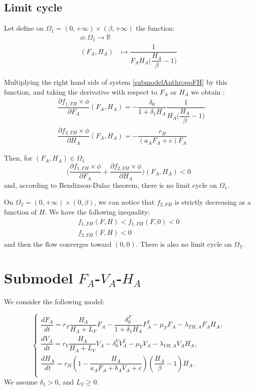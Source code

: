 \documentclass{article}
\begin{document}
\subsection{Limit cycle}

Let define on $\Omega_1 = (0, +\infty)\times (\beta, +\infty)$ the function:
\begin{align}
\phi : \Omega_1 \longrightarrow \mathbb{R} \label{limit cylce:phiFH}
\\
\nonumber
(F_A,H_A) & \mapsto \dfrac{1}{F_A H_A \Big(\dfrac{H_A}{\beta} - 1\Big)}
\end{align}

Multiplying the right hand side of system \eqref{submodelAnthropoFH} by this function, and taking the derivative with respect to $F_A$ or $H_A$ we obtain :
\begin{subequations}
\begin{align}
&\dfrac{\partial f_{1,FH} \times \phi}{\partial F_A}(F_A,H_A) = - \dfrac{\delta_0}{1 + \delta_1 H_A} \dfrac{1}{H_A \big(\dfrac{H_A}{\beta}-1 \big)} \\
&\dfrac{\partial f_{2,FH} \times \phi}{\partial H_A}(F_A,H_A) = - \dfrac{r_H}{(a_AF_A + c) F_A}
\end{align}
\end{subequations}

Then, for $(F_A, H_A) \in \Omega_1$
\begin{equation}
\Big(\dfrac{\partial f_{1,FH} \times \phi}{\partial F_A} + \dfrac{\partial f_{2,FH} \times \phi}{\partial H_A}\Big) (F_A, H_A) < 0
\end{equation}
and, according to Bendixson-Dulac theorem, there is no limit cycle on $\Omega_1$.

On $\Omega_2 = (0, +\infty)\times (0, \beta)$, we can notice that $f_{2, FH}$ is strictly decreasing as a function of $H$. We have the following inequality:
\begin{align*}
f_{1,FH}(F,H) < f_{1,FH}(F,0) < 0\\
f_{2,FH}(F,H) < 0
\end{align*}
and then the flow converges toward $(0,0)$. There is also no limit cycle on $\Omega_2$.

\newpage

\section{Submodel $F_A$-$V_A$-$H_A$}
We consider the following model:

\begin{equation}
\left\{ \begin{array}{l}
\dfrac{dF_{A}}{dt}=r_F  \dfrac{H_A}{H_A+L_F}F_A - \dfrac{\delta_0^F}{1 +\delta_1 H_A}F_A^2-\mu_{F}F_A-\lambda_{FH,A}F_AH_A,\\
\dfrac{dV_{A}}{dt}=r_V  \dfrac{H_A}{H_A+L_V}V_A - \delta_0^V V_A^2-\mu_{V}V_A-\lambda_{VH,A}V_AH_A,\\
\dfrac{dH_A}{dt}=r_{H}\left(1-\dfrac{H_A}{a_{A}F_{A} + b_A V_A +c}\right)\left(\dfrac{H_A}{\beta}-1\right)H_A. \\
\end{array}\right.
\label{modelAnthropoFVH}
\end{equation}
We assume $\delta_1 > 0$, and $L_V \geq 0$.
\end{document}
